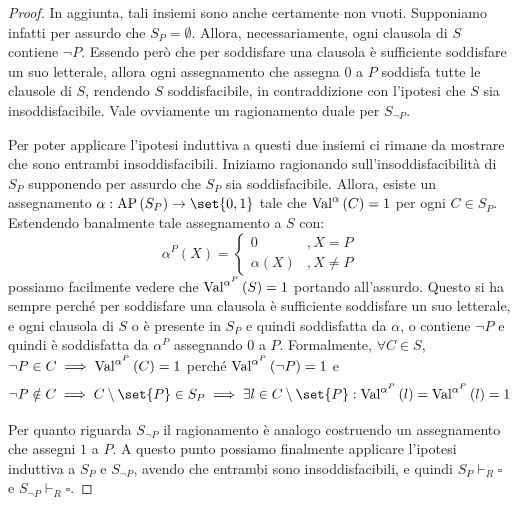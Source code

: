 \begin{proof}
  In aggiunta, tali insiemi sono anche certamente non vuoti. Supponiamo infatti per assurdo che \(S_P = \emptyset\). Allora, necessariamente, ogni clausola di \(S\) contiene \(\neg P\). Essendo però che per soddisfare una clausola è sufficiente soddisfare un suo letterale, allora ogni assegnamento che assegna \(0\) a \(P\) soddisfa tutte le clausole di \(S\), rendendo \(S\) soddisfacibile, in contraddizione con l'ipotesi che \(S\) sia insoddisfacibile. Vale ovviamente un ragionamento duale per \(S_{\neg P}\).

  Per poter applicare l'ipotesi induttiva a questi due insiemi ci rimane da mostrare che sono entrambi insoddisfacibili.
  Iniziamo ragionando sull'insoddisfacibilità di \(S_P\) supponendo per assurdo che \(S_P\) sia soddisfacibile. Allora, esiste un assegnamento \(\alpha: \AP[S_P] \to \set{0,1}\) tale che \(\Val{\alpha}[C] = 1\) per ogni \(C \in S_P\). Estendendo banalmente tale assegnamento a \(S\) con:
  \[\alpha^P(X) = \begin{cases}
    0 &, X=P\\
    \alpha(X) &, X\neq P
  \end{cases}\]
  possiamo facilmente vedere che \(\Val{\alpha^P}[S] = 1\) portando all'assurdo. Questo si ha sempre perché per soddisfare una clausola è sufficiente soddisfare un suo letterale, e ogni clausola di \(S\) o è presente in \(S_P\) e quindi soddisfatta da \(\alpha\), o contiene \(\neg P\) e quindi è soddisfatta da \(\alpha^P\) assegnando \(0\) a \(P\).
  Formalmente, \(\forall C \in S\), \(\neg P \in C \implies \Val{\alpha^P}[C] = 1\) perché \(\Val{\alpha^P}[\neg P] = 1\) e 
  \[\neg P \notin C \implies C\setminus\set{P} \in S_P \implies \exists l \in C\setminus\set{P} : \Val{\alpha^P}[l] = \Val{\alpha^P}[l] = 1\]

  Per quanto riguarda \(S_{\neg P}\) il ragionamento è analogo costruendo un assegnamento che assegni \(1\) a \(P\).
  A questo punto possiamo finalmente applicare l'ipotesi induttiva a \(S_P\) e \(S_{\neg P}\), avendo che entrambi sono insoddisfacibili, e quindi \(S_P\vdash_R \square\) e \(S_{\neg P}\vdash_R \square\).


\end{proof}
